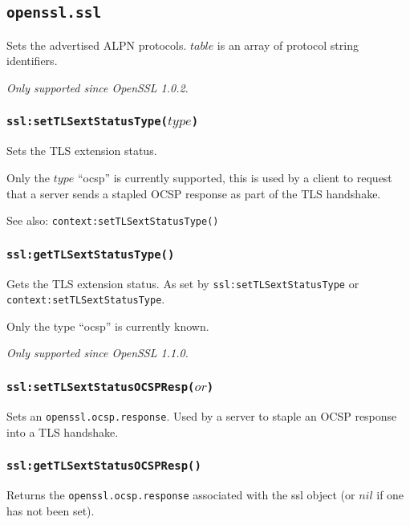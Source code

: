 \documentclass[11pt, oneside]{memoir}
\newcommand*{\fn}[1]{\texttt{#1}\xspace}
\newcommand*{\module}[1]{\texttt{#1}\xspace}
\newcounter{toccols}
\newenvironment{Module}[1]{
	\subsection{\texttt{#1}}
	\addtocontents{toc}{
		\protect\begin{multicols}{\value{toccols}}
	}
}{
	\addtocontents{toc}{\protect\end{multicols}}
}
\begin{document}
\begin{Module}{openssl.ssl}
Sets the advertised ALPN protocols. $table$ is an array of protocol string identifiers.

\emph{Only supported since OpenSSL 1.0.2.}

\subsubsection[\fn{ssl:setTLSextStatusType}]{\fn{ssl:setTLSextStatusType($type$)}}

Sets the TLS extension status.

Only the $type$ ``ocsp'' is currently supported, this is used by a client to request that a server sends a stapled OCSP response as part of the TLS handshake.

See also: \fn{context:setTLSextStatusType()}

\subsubsection[\fn{ssl:getTLSextStatusType}]{\fn{ssl:getTLSextStatusType()}}

Gets the TLS extension status. As set by \fn{ssl:setTLSextStatusType} or \fn{context:setTLSextStatusType}.

Only the type ``ocsp'' is currently known.

\emph{Only supported since OpenSSL 1.1.0.}

\subsubsection[\fn{ssl:setTLSextStatusOCSPResp}]{\fn{ssl:setTLSextStatusOCSPResp($or$)}}

Sets an \module{openssl.ocsp.response}. Used by a server to staple an OCSP response into a TLS handshake.

\subsubsection[\fn{ssl:getTLSextStatusOCSPResp}]{\fn{ssl:getTLSextStatusOCSPResp()}}

Returns the \module{openssl.ocsp.response} associated with the ssl object (or $nil$ if one has not been set).

\end{Module}
\end{document}
